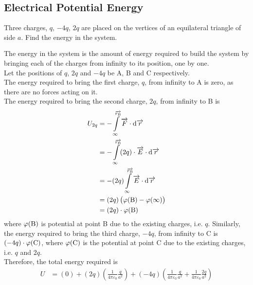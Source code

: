 \documentclass[fleqn, a4paper, 8pt, twoside]{amsart}
\theoremstyle{definition}
\theoremstyle{theorem}
\begin{document}
\begin{multicols}{2}
\begin{spacing}{0.6}
\section{Electrical Potential Energy}

\begin{question}
	Three charges, $q$, $-4q$, $2q$ are placed on the vertices of an equilateral triangle of side $a$. Find the energy in the system.
\end{question}

\begin{solution}
	The energy in the system is the amount of energy required to build the system by bringing each of the charges from infinity to its position, one by one.\\
	Let the positions of $q$, $2q$ and $-4q$ be A, B and C respectively.\\
	The energy required to bring the first charge, $q$, from infinity to A is zero, as there are no forces acting on it.\\
	The energy required to bring the second charge, $2q$, from infinity to B is 
	\begin{align*}
		U_{2q} &= - \int\limits_{\infty}^{\overrightarrow{r_\textnormal{B}}} \overrightarrow{F} \cdot \dif \overrightarrow{r}\\
		&= - \int\limits_{\infty}^{\overrightarrow{r_\textnormal{B}}} (2q) \cdot \overrightarrow{E} \cdot \dif \overrightarrow{r}\\
		&= - (2q) \int\limits_{\infty}^{\overrightarrow{r_\textnormal{B}}} \overrightarrow{E} \cdot \dif \overrightarrow{r}\\
		&= (2q) \left( \varphi(\textnormal{B}) - \varphi(\infty) \right)\\
		&= (2q) \cdot \varphi(\textnormal{B})
	\end{align*}
	where $\varphi(\textnormal{B})$ is potential at point B due to the existing charges, i.e. $q$.
	Similarly, the energy required to bring the third charge, $-4q$, from infinity to C is $(-4q) \cdot \varphi(\textnormal{C})$, where $\varphi(\textnormal{C})$ is the potential at point C due to the existing charges, i.e. $q$ and $2q$.\\
	Therefore, the total energy required is
	\begin{align*}
		U &= \left( 0 \right) + (2q) \left( \frac{1}{4 \pi \varepsilon_0} \frac{q}{a^2} \right) + (-4q) \left( \frac{1}{4 \pi \varepsilon_0} \frac{q}{a^2} + \frac{1}{4 \pi \varepsilon_0} \frac{2q}{a^2} \right)
	\end{align*}
\end{solution}


\end{spacing}
\end{multicols}
\end{document}
